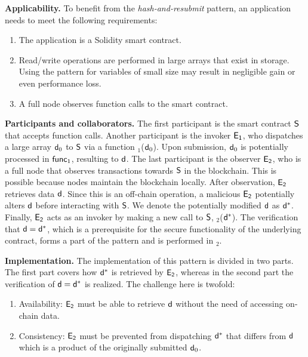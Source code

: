\noindent
\textbf{Applicability.}
To benefit from the \emph{hash-and-resubmit} pattern, an application needs to
meet the following requirements:

\begin{enumerate}
    \item The application is a Solidity smart contract.
    \item Read/write operations are performed in large arrays that exist in
        storage. Using the pattern for variables of small size may result in
        negligible gain or even performance loss.
    \item A full node observes function calls to the smart contract.
\end{enumerate}

\noindent \textbf{Participants and collaborators.} The first participant is the
smart contract $\mathsf{S}$ that accepts function calls. Another participant is
the invoker $\mathsf{E_{1}}$, who dispatches a large array $\mathsf{d}_0$ to $\mathsf{S}$
via a function \texttt{\proc$_1$}($\mathsf{d}_0$). Upon submission, $\mathsf{d}_0$ is
potentially processed in $\textsf{func}_1$, resulting to $\mathsf{d}$. The last participant
is the observer $\mathsf{E_{2}}$, who is a full node that observes transactions
towards $\mathsf{S}$ in the blockchain. This is possible because nodes maintain
the blockchain locally. After observation, $\mathsf{E_{2}}$ retrieves data $\mathsf{d}$.
Since this is an off-chain operation, a malicious $\mathsf{E_{2}}$ potentially
alters $\mathsf{d}$ before interacting with $\mathsf{S}$. We denote the
potentially modified $\mathsf{d}$ as $\mathsf{d^*}$. Finally, $\mathsf{E_{2}}$ acts as an
invoker by making a new call to $\mathsf{S}$, \texttt{\proc$_2$}($\mathsf{d^*}$). The
verification that $\mathsf{d} = \mathsf{d^*}$, which is a prerequisite for the secure
functionality of the underlying contract, forms a part of the pattern and is
performed in \texttt{\proc$_2$}.

\noindent \textbf{Implementation.} The implementation of this pattern is
divided in two parts. The first part covers how $\mathsf{d^*}$ is retrieved by
$\mathsf{E_{2}}$, whereas in the second part the verification of $\mathsf{d}=\mathsf{d^*}$ is
realized. The challenge here is twofold:

\begin{enumerate}

    \item Availability: $\mathsf{E_{2}}$ must be able to retrieve $\mathsf{d}$ without
        the need of accessing on-chain data.

    \item Consistency: $\mathsf{E_{2}}$ must be prevented from dispatching $\mathsf{d^*}$
        that differs from $\mathsf{d}$ which is a product of the originally submitted
        $\mathsf{d}_0$.

\end{enumerate}


